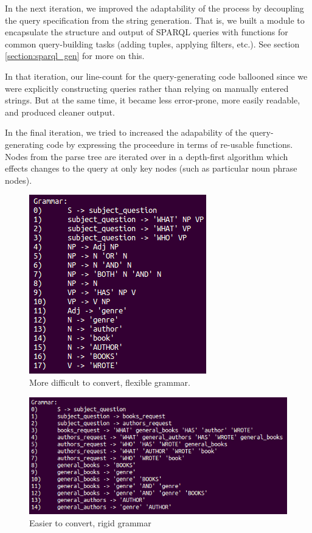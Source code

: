 \documentclass[11pt]{article}
\begin{document}
In the next iteration, we improved the adaptability of the process by 
decoupling the query specification from the string generation. 
That is, we built a module to encapsulate the structure and output of SPARQL
queries with functions for common query-building tasks (adding tuples, 
applying filters, etc.). See section \ref{section:sparql_gen} for more on this.

In that iteration, our line-count for the query-generating code ballooned since
we were explicitly constructing queries rather than relying on manually
entered strings. But at the same time, it became less error-prone, more
easily readable, and produced cleaner output.

In the final iteration, we tried to increased the adapability of the 
query-generating code by expressing the proceedure in terms of re-usable
functions. Nodes from the parse tree are iterated over in a depth-first
algorithm which effects changes to the query at only key nodes (such
as particular noun phrase nodes).

\begin{figure}[h!]
    \centering
    \includegraphics[width=.5\textwidth,natwidth=1,natheight=1]{imgs/demo/grammar2.png}
    \caption{More difficult to convert, flexible grammar.}
    \label{fig:slow_grammar}
\end{figure}

\begin{figure}[h!]
    \centering
    \includegraphics[width=1\textwidth,natwidth=1,natheight=1]{imgs/demo/grammar3.png}
    \caption{Easier to convert, rigid grammar}
    \label{fig:fast_grammar}
\end{figure}
\end{document}
